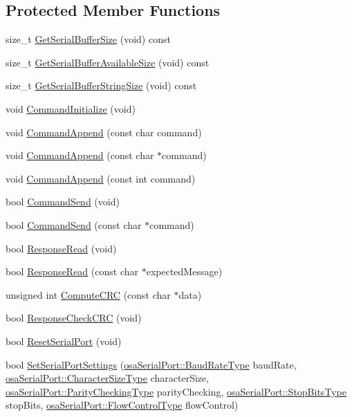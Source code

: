 \subsection*{Protected Member Functions}
\begin{DoxyCompactItemize}
\item 
size\+\_\+t \hyperlink{classmts_n_d_i_serial_ac8a27a2d361d54e18f42bbb781579f89}{Get\+Serial\+Buffer\+Size} (void) const 
\item 
size\+\_\+t \hyperlink{classmts_n_d_i_serial_ab92f85026b083a1fcdf9d922b3ab68f7}{Get\+Serial\+Buffer\+Available\+Size} (void) const 
\item 
size\+\_\+t \hyperlink{classmts_n_d_i_serial_a9f357b1e5da8c03386bb4dc2f1542bd1}{Get\+Serial\+Buffer\+String\+Size} (void) const 
\item 
void \hyperlink{classmts_n_d_i_serial_a8a6ba78f9b80fdb24fd189422da7e4b5}{Command\+Initialize} (void)
\item 
void \hyperlink{classmts_n_d_i_serial_a9366654f3d449d347c6a14b9b8252a9a}{Command\+Append} (const char command)
\item 
void \hyperlink{classmts_n_d_i_serial_a2e12dd893750b4e5e64082f5b8993a05}{Command\+Append} (const char $\ast$command)
\item 
void \hyperlink{classmts_n_d_i_serial_af1cc056933ad733c71f816f5b72085cb}{Command\+Append} (const int command)
\item 
bool \hyperlink{classmts_n_d_i_serial_a2c67f959ae4cf47b2046395d2e8c2104}{Command\+Send} (void)
\item 
bool \hyperlink{classmts_n_d_i_serial_aa69c858f9e2d77de24f60d001aaf8d1b}{Command\+Send} (const char $\ast$command)
\item 
bool \hyperlink{classmts_n_d_i_serial_ae12efe6d7a99785ff11d5957ecf7bc9d}{Response\+Read} (void)
\item 
bool \hyperlink{classmts_n_d_i_serial_a843967c21008da12c0cef308560111dc}{Response\+Read} (const char $\ast$expected\+Message)
\item 
unsigned int \hyperlink{classmts_n_d_i_serial_a0687fdfd5546056b54ccb0d823349810}{Compute\+C\+R\+C} (const char $\ast$data)
\item 
bool \hyperlink{classmts_n_d_i_serial_a69f428347e1556446792be003d9acbc7}{Response\+Check\+C\+R\+C} (void)
\item 
bool \hyperlink{classmts_n_d_i_serial_ae710bd6959672cf21a126b8d1dcaae0d}{Reset\+Serial\+Port} (void)
\item 
bool \hyperlink{classmts_n_d_i_serial_a23de00ad1b5a7008917998252c8b0b05}{Set\+Serial\+Port\+Settings} (\hyperlink{group__cisst_o_s_abstraction_ga3fd8e997892088f924754f9cc11c78a4}{osa\+Serial\+Port\+::\+Baud\+Rate\+Type} baud\+Rate, \hyperlink{group__cisst_o_s_abstraction_ga9b6b558d8e4327ca921d9c010bec0462}{osa\+Serial\+Port\+::\+Character\+Size\+Type} character\+Size, \hyperlink{group__cisst_o_s_abstraction_ga5a7547284e891eed488992c6a7204bfa}{osa\+Serial\+Port\+::\+Parity\+Checking\+Type} parity\+Checking, \hyperlink{group__cisst_o_s_abstraction_gaaa561ff95e10634b7ffa9ebf0ff164b5}{osa\+Serial\+Port\+::\+Stop\+Bits\+Type} stop\+Bits, \hyperlink{group__cisst_o_s_abstraction_ga006138c4626520d3c2c1e5a78b279435}{osa\+Serial\+Port\+::\+Flow\+Control\+Type} flow\+Control)

\end{DoxyCompactItemize}
